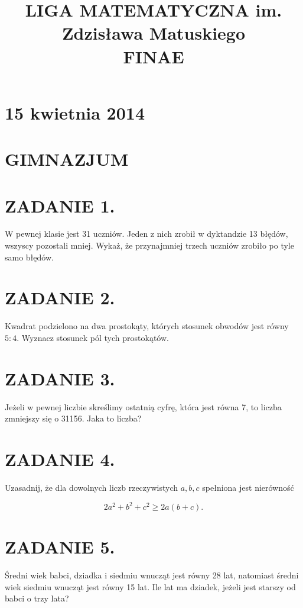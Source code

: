 \documentclass[10pt]{article}
\title{LIGA MATEMATYCZNA im. Zdzisława Matuskiego \\
 FINAE }
\author{}
\date{}
\begin{document}
\maketitle
\section*{15 kwietnia 2014}
\section*{GIMNAZJUM}
\section*{ZADANIE 1.}
W pewnej klasie jest 31 uczniów. Jeden z nich zrobił w dyktandzie 13 błędów, wszyscy pozostali mniej. Wykaż, że przynajmniej trzech uczniów zrobiło po tyle samo błędów.

\section*{ZADANIE 2.}
Kwadrat podzielono na dwa prostokąty, których stosunek obwodów jest równy \(5: 4\). Wyznacz stosunek pól tych prostokątów.

\section*{ZADANIE 3.}
Jeżeli w pewnej liczbie skreślimy ostatnią cyfrę, która jest równa 7, to liczba zmniejszy się o 31156. Jaka to liczba?

\section*{ZADANIE 4.}
Uzasadnij, że dla dowolnych liczb rzeczywistych \(a, b, c\) spełniona jest nierówność

\[
2 a^{2}+b^{2}+c^{2} \geqslant 2 a(b+c) .
\]

\section*{ZADANIE 5.}
Średni wiek babci, dziadka i siedmiu wnucząt jest równy 28 lat, natomiast średni wiek siedmiu wnucząt jest równy 15 lat. Ile lat ma dziadek, jeżeli jest starszy od babci o trzy lata?
\end{document}
